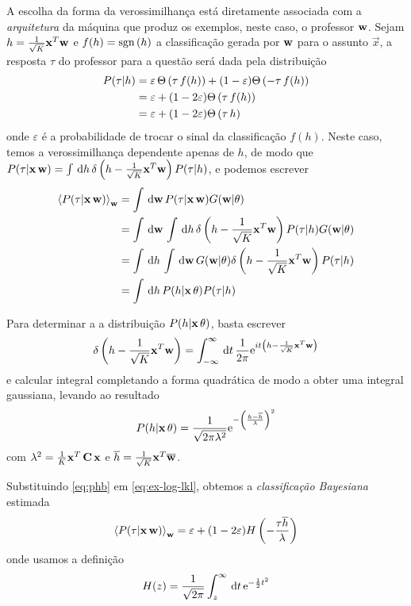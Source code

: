 \newcommand{\outf}[1]{\ensuremath{\sgn\inpr{#1}}}
\newcommand{\hfunc}[1]{\ensuremath{\frac{1}{\sqrt{K}}\vec{x}^T#1}}
\newcommand{\hrl}{\ensuremath{\hfunc{\rl}}}
\newcommand{\htfunc}{\ensuremath{\hfunc{\wt}}}
\newcommand{\htv}{\ensuremath{\overline{h}}}
\newcommand{\ns}{\ensuremath{\varepsilon}} A escolha da forma da verossimilhança está
diretamente associada com a \emph{arquitetura} da máquina que produz os exemplos, neste caso, o professor $\mathbf{w}$.
Sejam $h = \hrl$ e $f(h) = \outf{h}$ a classificação gerada por $\mathbf{w}$ para o assunto $\vec{x}$, a resposta $\tau$ do professor para a questão será dada pela distribuição
\begin{align}\label{eq:veros}
    P(\tau|h) & = \ns\,\Theta\inpr{\tau\,f(h)}
    + (1-\ns)\Theta\inpr{-\tau\,f(h)} \notag \\
    & = \ns + (1-2\ns)\Theta\inpr{\tau\,f(h)} \notag \\
    & = \ns + (1-2\ns)\Theta\inpr{\tau\,h}
\end{align}
onde $\ns$ é a probabilidade de trocar o sinal da classificação $f(h)$.
Neste caso, temos a verossimilhança dependente apenas de $h$, de modo que $P(\tau|\vec{x}\,\rl) = \int\msr{h}\delta\inpr{h-\hrl}P(\tau|h)$, e podemos escrever
\begin{align}\label{eq:ex-log-lkl}
   \Ex{\lkl}_{\rl}& = \int\msr{\rl}\lkl\gt \notag \\
   & = \int\msr{\rl}\int\msr{h}
   \delta\inpr{h-\hrl}P(\tau|h)\gt \notag \\
   & = \int\msr{h}\int\msr{\rl}
   \gt\delta\inpr{h-\hrl}P(\tau|h) \notag \\
   & = \int\msr{h}P(h|\vec{x}\,\At)P(\tau|h)
\end{align}

\newcommand{\varh}{\ensuremath{\lambda}}
Para determinar a a distribuição $P(h|\mathbf{x}\,\theta)$, basta escrever
\[
    \delta\inpr{h-\hrl} = \int^{\infty}_{-\infty}\msr{t}\frac{1}{2\pi}\EulerE^{it\inpr{h-\hrl}}
\]
e calcular integral completando a forma quadrática de modo a obter uma integral gaussiana, levando ao resultado
\begin{align}\label{eq:phb}
    P(h|\vec{x}\,\At) = \frac{1}{\sqrt{2\pi \varh^2}}
    \EulerE^{-\inpr{\frac{h-\htv}{\varh}}^2}
\end{align}
com $\varh^2=\frac{1}{K}\vec{x}^T\,\Ct\,\vec{x}$ e $\htv = \htfunc$.

Substituindo \eqref{eq:phb} em \eqref{eq:ex-log-lkl}, obtemos a \emph{classificação Bayesiana} estimada \begin{align}\label{eq:bayes-cls}
    \Ex{\lkl}_{\rl} = \ns + (1-2\ns)H\inpr{-\frac{\tau\htv}{\varh}}
\end{align}
onde usamos a definição  \[H(z)=\frac{1}{\sqrt{2\pi}}\int^{\infty}_z\,\mathrm{d} t\,\mathrm{e}^{-{1 \over 2} t^2}\]

